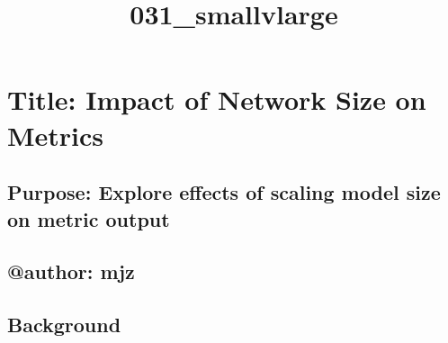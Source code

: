 \documentclass[11pt]{article}
\title{031\_smallvlarge}
\begin{document}
    
    \maketitle
    
    

    
    \section{Title: Impact of Network Size on
Metrics}\label{title-impact-of-network-size-on-metrics}

\subsection{Purpose: Explore effects of scaling model size on metric
output}\label{purpose-explore-effects-of-scaling-model-size-on-metric-output}

\subsection{@author: mjz}\label{author-mjz}

    

    \subsection{Background}\label{background}
\end{document}
